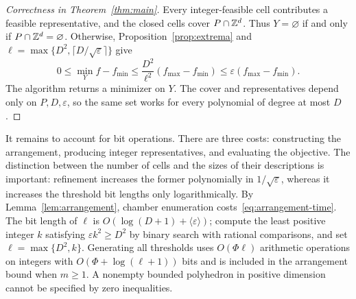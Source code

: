 \documentclass[11pt]{article}
\theoremstyle{definition}\newtheorem{definition}{Definition}[section]
\theoremstyle{remark}\newtheorem{remark}[theorem]{Remark}
\newcommand{\eps}{\varepsilon}
\begin{document}
\begin{algorithm}[htbp]
\caption{The representative algorithm. Steps 1--9 depend only on $P,D,\eps$; the objective coefficients enter in step 10. Replacing $\arg\min$ by $\arg\max$ gives the corresponding maximization guarantee.}
\label{alg:sampling}
\end{algorithm}

\begin{proof}[Correctness in Theorem~\ref{thm:main}]
Every integer-feasible cell contributes a feasible representative, and the closed cells cover $P\cap\mathbb Z^d$. Thus $Y=\varnothing$ if and only if $P\cap\mathbb Z^d=\varnothing$. Otherwise, Proposition~\ref{prop:extrema} and $\ell=\max\{D^2,\lceil D/\sqrt\eps\rceil\}$ give
\[
 0\le\min_Y f-f_{\min}\le \frac{D^2}{\ell^2}(f_{\max}-f_{\min})\le\eps (f_{\max}-f_{\min}).
\]
The algorithm returns a minimizer on $Y$. The cover and representatives depend only on $P,D,\eps$, so the same set works for every polynomial of degree at most $D$.
\end{proof}

It remains to account for bit operations. There are three costs: constructing the arrangement, producing integer representatives, and evaluating the objective. The distinction between the number of cells and the sizes of their descriptions is important: refinement increases the former polynomially in $1/\sqrt\eps$, whereas it increases the threshold bit lengths only logarithmically.
By Lemma~\ref{lem:arrangement}, chamber enumeration costs~\eqref{eq:arrangement-time}. The bit length of $\ell$ is $O(\log(D+1)+\langle\eps\rangle)$; compute the least positive integer $k$ satisfying $\eps k^2\ge D^2$ by binary search with rational comparisons, and set $\ell=\max\{D^2,k\}$. Generating all thresholds uses $O(\Phi\ell)$ arithmetic operations on integers with $O(\Phi+\log(\ell+1))$ bits and is included in the arrangement bound when $m\ge1$. A nonempty bounded polyhedron in positive dimension cannot be specified by zero inequalities.
\end{document}
